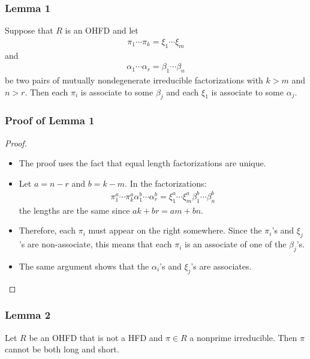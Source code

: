 \begin{frame}
  \frametitle{Lemma 1}
  \begin{lemma}
    Suppose that $R$ is an OHFD and let
    \begin{align*}
      \pi_1\cdots\pi_k=\xi_1\cdots\xi_m
    \end{align*}
    and
    \begin{align*}
      \alpha_1\cdots\alpha_r=\beta_1\cdots\beta_n
    \end{align*}
    be two pairs of mutually nondegenerate irreducible factorizations with $k>m$ and $n>r$.
    Then each $\pi_i$ is associate to some $\beta_j$ and each $\xi_1$ is associate to some $\alpha_j$. 
  \end{lemma}
\end{frame}

\begin{frame}
  \frametitle{Proof of Lemma 1}
  \begin{proof}
    \begin{itemize}
      \item <1->The proof uses the fact that equal length factorizations are unique.
      \item <2->Let $a = n-r$ and $b = k - m$. In the factorizations:
	\begin{align*}
	  \pi_1^a\cdots\pi_k^a\alpha_1^b\cdots\alpha_r^b=\xi_1^a\cdots\xi_m^a\beta_1^b\cdots\beta_n^b
	\end{align*}
	the lengths are the same since $ak+br=am+bn$. 
      \item <3->
	Therefore, each $\pi_i$ must appear on the right somewhere.
	Since the $\pi_i$'s and $\xi_j$'s are non-associate, this means that each $\pi_i$ is an associate of one of the $\beta_j$'s. 
      \item<4->The same argument shows that the $\alpha_i$'s and $\xi_j$'s are associates. 
    \end{itemize}
  \end{proof}
\end{frame}

\begin{frame}
  \frametitle{Lemma 2}
  \begin{lemma}
    Let $R$ be an OHFD that is not a HFD and $\pi \in R$ a nonprime irreducible. Then $\pi$ cannot be both long and short.
  \end{lemma}
\end{frame}

